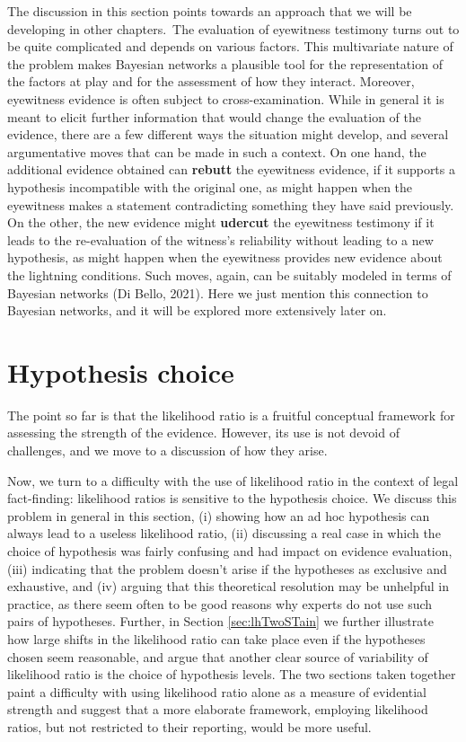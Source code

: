 \documentclass[
  10pt,
  dvipsnames,enabledeprecatedfontcommands]{scrartcl}
\begin{document}
The discussion in this section points towards an approach that we will
be developing in other chapters.\(\,\) The evaluation of
eyewitness testimony turns out to be quite complicated and depends on
various factors. This multivariate nature of the problem makes Bayesian
networks a plausible tool for the representation of the factors at play
and for the assessment of how they interact. Moreover, eyewitness
evidence is often subject to cross-examination. While in general it is
meant to elicit further information that would change the evaluation of
the evidence, there are a few different ways the situation might
develop, and several argumentative moves that can be made in such a
context. On one hand, the additional evidence obtained can
\textbf{rebutt} the eyewitness evidence, if it supports a hypothesis
incompatible with the original one, as might happen when the eyewitness
makes a statement contradicting something they have said previously. On
the other, the new evidence might \textbf{udercut} the eyewitness
testimony if it leads to the re-evaluation of the witness's reliability
without leading to a new hypothesis, as might happen when the eyewitness
provides new evidence about the lightning conditions. Such moves, again,
can be suitably modeled in terms of Bayesian networks (Di Bello, 2021).
Here we just mention this connection to Bayesian networks, and it will
be explored more extensively later on.

\hypertarget{hypothesis-choice}{%
\section{\texorpdfstring{Hypothesis choice
\label{sec:hchoice}}{Hypothesis choice }}\label{hypothesis-choice}}

The point so far is that the likelihood ratio is a fruitful conceptual
framework for assessing the strength of the evidence. However, its use
is not devoid of challenges, and we move to a discussion of how they
arise.

Now, we turn to a difficulty with the use of likelihood ratio in the
context of legal fact-finding: likelihood ratios is sensitive to the
hypothesis choice. We discuss this problem in general in this section,
(i) showing how an ad hoc hypothesis can always lead to a useless
likelihood ratio, (ii) discussing a real case in which the choice of
hypothesis was fairly confusing and had impact on evidence evaluation,
(iii) indicating that the problem doesn't arise if the hypotheses as
exclusive and exhaustive, and (iv) arguing that this theoretical
resolution may be unhelpful in practice, as there seem often to be good
reasons why experts do not use such pairs of hypotheses. Further, in
Section \ref{sec:lhTwoSTain} we further illustrate how large shifts in
the likelihood ratio can take place even if the hypotheses chosen seem
reasonable, and argue that another clear source of variability of
likelihood ratio is the choice of hypothesis levels. The two sections
taken together paint a difficulty with using likelihood ratio alone as a
measure of evidential strength and suggest that a more elaborate
framework, employing likelihood ratios, but not restricted to their
reporting, would be more useful.
\end{document}
